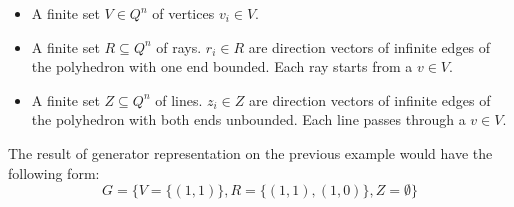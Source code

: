 \begin{itemize}
    \item A finite set $V\in Q^n$ of vertices $v_i \in V$.
    \item A finite set $R \subseteq Q^n$ of rays. $r_i \in R$ are direction vectors of infinite edges of the polyhedron with one end bounded. Each ray starts from a $v \in V$.
    \item  A finite set $Z \subseteq Q^n$ of lines. $z_i \in Z$ are direction vectors of infinite edges of the polyhedron with both ends unbounded. Each line passes through a $v \in V$.
\end{itemize}
The result of generator representation on the previous example would have the following form: 
\begin{equation}
    G = \{ V = \{(1,1)\}, R = \{(1,1),(1,0) \}, Z = \emptyset \}
\end{equation}
